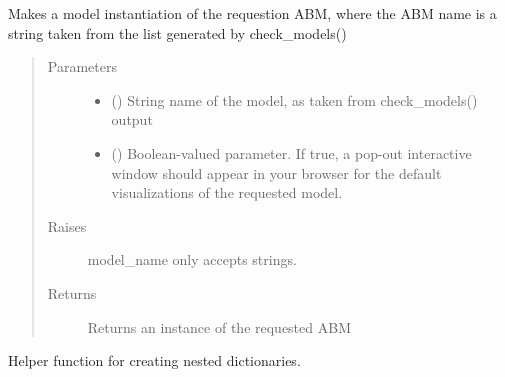 \documentclass[letterpaper,10pt,english]{sphinxmanual}
\begin{document}
\begin{fulllineitems}
\label{\detokenize{index:oabm_tools.make}}
Makes a model instantiation of the requestion ABM, where the ABM name is a string taken from the list generated by check\_models()
\begin{quote}\begin{description}
\item[{Parameters}] \leavevmode\begin{itemize}
\item {} 
 () \textendash{} String name of the model, as taken from check\_models() output

\item {} 
 () \textendash{} Boolean-valued parameter. If true, a pop-out interactive window should appear in your browser for the default visualizations of the requested model.

\end{itemize}

\item[{Raises}] \leavevmode
{} \textendash{} model\_name only accepts strings.

\item[{Returns}] \leavevmode
Returns an instance of the requested ABM

\end{description}\end{quote}

\end{fulllineitems}


\begin{fulllineitems}
\label{\detokenize{index:oabm_tools.nested_dict}}
Helper function for creating nested dictionaries.

\end{fulllineitems}

\end{document}
